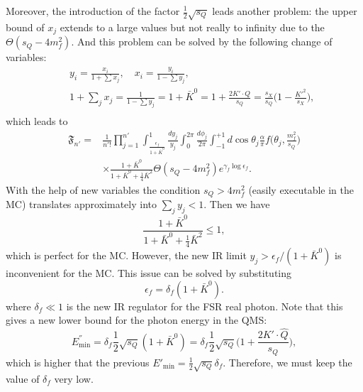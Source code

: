 Moreover, the introduction of the factor $\frac{1}{2}\sqrt{s_Q}$ leads another problem: the upper bound of $x_j$ extends to a large values but not really to infinity due to the $\Theta(s_Q-4m^2_f)$. And this problem can be solved by the following change of variables:
\begin{eqnarray}
&&y_i=\frac{x_i}{1+\sum x_j},\quad x_i=\frac{y_i}{1-\sum y_j},\nonumber\\
&&1+\sum_jx_j=\frac{1}{1-\sum y_j}=1+\bar{K}^0=1+\frac{2K'\cdot Q}{s_Q}=\frac{s_X}{s_Q}\biggl(1-\frac{K'^2}{s_X}\biggr),\nonumber\\
\end{eqnarray}
which leads to
\begin{align}
\mathfrak{F}_{n'}=&\frac{1}{n'!}\prod_{j=1}^{n'}\int_{\frac{\epsilon_f}{1+\bar{K}^0}}^{1}\frac{dy_j}{y_j}\int_{0}^{2\pi}\frac{d\phi_j}{2\pi}\int_{-1}^{+1}d\cos\theta_j\frac{\alpha}{\pi}f\biggl(\theta_j,\frac{m^2_f}{s_Q}\biggr)\nonumber\\
&\times\frac{1+\bar{K}^0}{1+\bar{K}^0+\frac{1}{4}\bar{K}^2}\Theta(s_Q-4m_f^2)e^{\gamma_f\log\epsilon_f}.
\end{align}
With the help of new variables the condition $s_Q>4m^2_f$ (easily executable in the MC) translates approximately into $\sum_j y_j<1$. Then we have
\begin{equation*}
\frac{1+\bar{K}^0}{1+\bar{K}^0+\frac{1}{4}\bar{K}^2}\leq 1,
\end{equation*}
which is perfect for the MC. However, the new IR limit $y_j>\epsilon_f/(1+\bar{K}^0)$ is inconvenient for the MC. This issue can be solved by substituting
\begin{equation}
\epsilon_f=\delta_f(1+\bar{K}^0).
\end{equation}
where $\delta_f\ll 1$ is the new IR regulator for the FSR real photon. Note that this gives a new lower bound for the photon energy in the QMS:
\begin{equation}
E^{''}_\text{min}=\delta_f\frac{1}{2}\sqrt{s_Q}(1+\bar{K}^0)=\delta_f\frac{1}{2}\sqrt{s_Q}\biggl(1+\frac{2K'\cdot\hat{Q}}{s_Q}\biggr),
\end{equation}
which is higher that the previous $E'_\text{min}=\frac{1}{2}\sqrt{s_Q}\delta_f$. Therefore, we must keep the value of $\delta_f$ very low.

